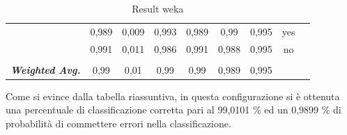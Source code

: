 \begin{table}[htbp]
{\begin{tabular}{rrrrrrrrr}
		\multicolumn{1}{c}{} & \multicolumn{1}{c}{0,989} & \multicolumn{1}{c}{0,009} & \multicolumn{1}{c}{0,993} & \multicolumn{1}{c}{0,989} & \multicolumn{1}{c}{0,99} & \multicolumn{1}{c}{0,995} & \multicolumn{1}{c}{yes} &  \\
		\multicolumn{1}{c}{} & \multicolumn{1}{c}{0,991} & \multicolumn{1}{c}{0,011} & \multicolumn{1}{c}{0,986} & \multicolumn{1}{c}{0,991} & \multicolumn{1}{c}{0,988} & \multicolumn{1}{c}{0,995} & \multicolumn{1}{c}{no} &  \\
		\multicolumn{1}{c}{} & \multicolumn{1}{c}{} & \multicolumn{1}{c}{} & \multicolumn{1}{c}{} & \multicolumn{1}{c}{} & \multicolumn{1}{c}{} & \multicolumn{1}{c}{} & \multicolumn{1}{c}{} &  \\
		\multicolumn{1}{c}{\textit{\textbf{Weighted Avg.}}} & \multicolumn{1}{c}{0,99} & \multicolumn{1}{c}{0,01} & \multicolumn{1}{c}{0,99} & \multicolumn{1}{c}{0,99} & \multicolumn{1}{c}{0,989} & \multicolumn{1}{c}{0,995} & \multicolumn{1}{c}{} &  \\
		\end{tabular}%
	}
	\label{tab:FTExtendFiltered}%
	\caption{Result weka}
\end{table}%

Come si evince dalla tabella riassuntiva, in questa configurazione si è ottenuta una percentuale di classificazione corretta pari al 99,0101 \% ed un 0,9899 \% di probabilità di commettere errori nella classificazione.